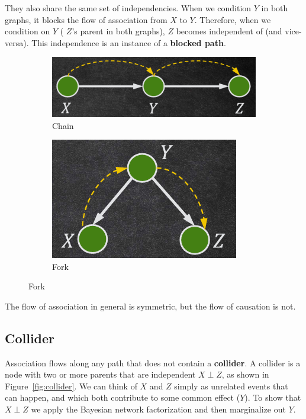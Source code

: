 They also share the same set of independencies. When we condition $Y$ in both
graphs, it blocks the flow of association from $X$ to $Y$. Therefore, when we
condition on $Y$ ( $Z$'s parent in both graphs), $Z$ becomes independent of (and
vice-versa). This independence is an instance of a \textbf{blocked path}.

\begin{figure}[!ht]
    \centering
    \begin{subfigure}[b]{0.45\textwidth}
        \includegraphics[width=\textwidth]{img/flow/chain.png}
        \caption{Chain}
        \label{fig:chain}
    \end{subfigure}
    \hfill
    \begin{subfigure}[b]{0.45\textwidth}
        \includegraphics[scale=0.5]{img/flow/fork.png}
        \caption{Fork}
        \label{fig:fork}
    \end{subfigure}
\end{figure}

\begin{note}
    The flow of association in general is symmetric, but the flow of causation
    is not.
\end{note}
\subsection{Collider}
Association flows along any path that does not contain a \textbf{collider}. A
collider is a node with two or more parents that are independent $X \perp Z$, as
shown in Figure~\ref{fig:collider}. We can think of $X$ and $Z$ simply as unrelated
events that can happen, and which both contribute to some common effect ($Y$).
To show that $X \perp Z$ we apply the Bayesian network factorization and then
marginalize out $Y$.

